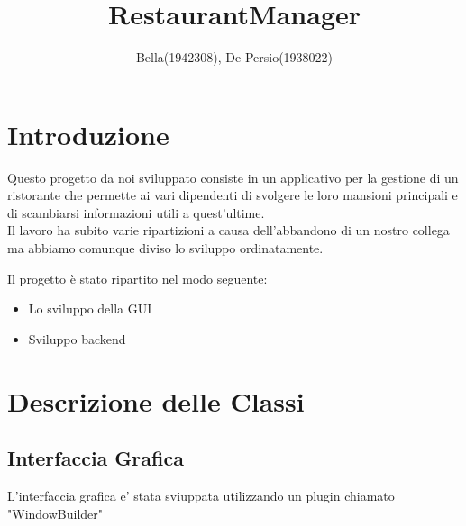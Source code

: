 \documentclass{article}
\title{RestaurantManager}
\author{Bella(1942308), De Persio(1938022)}
\date{}
\begin{document}
\maketitle

\section{Introduzione}

    Questo progetto da noi sviluppato consiste in un applicativo per la gestione di un ristorante che permette ai vari dipendenti di svolgere le loro mansioni principali e di scambiarsi informazioni utili a quest'ultime. \\
    Il lavoro ha subito varie ripartizioni a causa dell'abbandono di un nostro collega ma abbiamo comunque diviso lo sviluppo ordinatamente.
    \par Il progetto è stato ripartito nel modo seguente:
    \begin{itemize}
        \item Lo sviluppo della GUI
        \item Sviluppo backend              %
    \end{itemize}


\section{Descrizione delle Classi}

    \subsection{Interfaccia Grafica}
    
    L'interfaccia grafica e' stata sviuppata utilizzando un plugin chiamato "WindowBuilder"
    
\end{document}
